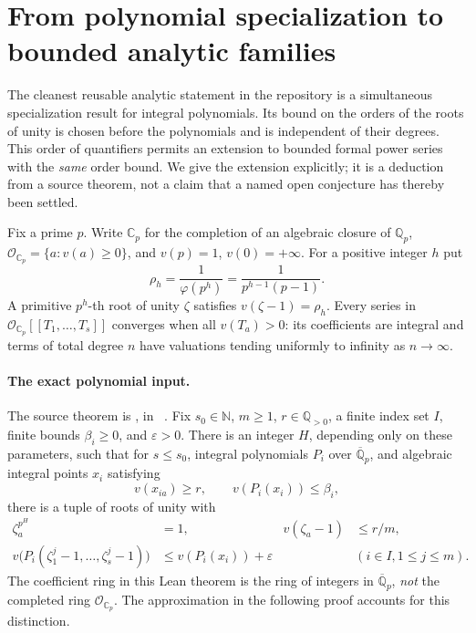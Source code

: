 
\section{From polynomial specialization to bounded analytic families}
\label{sec:series-specialization}

The cleanest reusable analytic statement in the repository is a simultaneous
specialization result for integral polynomials.  Its bound on the orders of the
roots of unity is chosen before the polynomials and is independent of their
degrees.  This order of quantifiers permits an extension to bounded formal
power series with the \emph{same} order bound.  We give the extension explicitly;
it is a deduction from a source theorem, not a claim that a named open conjecture
has thereby been settled.

Fix a prime $p$.  Write $\mathbb C_p$ for the completion of an algebraic closure
of $\mathbb Q_p$, $\mathcal O_{\mathbb C_p}=\{a:v(a)\geq0\}$, and
$v(p)=1$, $v(0)=+\infty$.  For a positive integer $h$ put
\[
  \rho_h=\frac1{\varphi(p^h)}=\frac1{p^{h-1}(p-1)}.
\]
A primitive $p^h$-th root of unity $\zeta$ satisfies
$v(\zeta-1)=\rho_h$.  Every series in
$\mathcal O_{\mathbb C_p}[[T_1,\ldots,T_s]]$ converges when all
$v(T_a)>0$: its coefficients are integral and terms of total degree $n$
have valuations tending uniformly to infinity as $n\to\infty$.

\paragraph{The exact polynomial input.}
The source theorem is
, in
~\cite{roots,general}.
Fix $s_0\in\mathbb N$, $m\geq1$, $r\in\mathbb Q_{>0}$, a finite
index set $I$, finite bounds $\beta_i\geq0$, and $\varepsilon>0$.
There is an integer $H$, depending only on these parameters, such that for
$s\leq s_0$, integral polynomials $P_i$ over $\overline{\mathbb Q}_p$,
and algebraic integral points $x_i$ satisfying
\[
 v(x_{ia})\geq r,\qquad v(P_i(x_i))\leq\beta_i,
\]
there is a tuple of roots of unity with
\begin{align}
 \zeta_a^{p^H}&=1,& v(\zeta_a-1)&\leq r/m,\label{eq:torsion-radius}\\
 v\bigl(P_i(\zeta_1^j-1,\ldots,\zeta_s^j-1)\bigr)
   &\leq v(P_i(x_i))+\varepsilon
 &&(i\in I, 1\leq j\leq m).\label{eq:polynomial-torsion}
\end{align}
The coefficient ring in this Lean theorem is the ring of integers in
$\overline{\mathbb Q}_p$, \emph{not} the completed ring
$\mathcal O_{\mathbb C_p}$.  The approximation in the following proof accounts
for this distinction.

